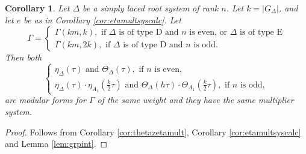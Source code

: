 \documentclass[11pt,a4paper]{amsart}
\newtheorem{corollary}[theorem]{Corollary}
\theoremstyle{definition}
\begin{document}
\begin{corollary} Let $\Delta$ be a simply laced root system of rank $n$. Let $k=|G_{\Delta}|$, and let $e$ be as in Corollary \ref{cor:etamultsyscalc}. 
Let \[\Gamma=\begin{cases}
\Gamma(km,k), \textrm{ if } \Delta \textrm{ is of type D and } n \textrm{ is even, or } \Delta \textrm{ is of type E} \\
\Gamma(km,2k), \textrm{ if } \Delta \textrm{ is of type D and } n \textrm{ is odd}.
\end{cases}\]
Then both
\[
\begin{cases}
\eta_{\Delta}(\tau) \textrm{ and }\Theta_{\Delta}(\tau), \textrm{ if } n \textrm{ is even}, \\
\eta_{\Delta}(\tau) \cdot \eta_{A_1}(\frac{k}{2}\tau) \textrm{ and }\Theta_{\Delta}(h\tau) \cdot \Theta_{A_1}(\frac{k}{2}\tau), \textrm{ if } n \textrm{ is odd},
\end{cases}
\]
are modular forms for $\Gamma$ of the same weight and they have the same multiplier system.
\label{cor:etathetamod}
\end{corollary}
\begin{proof}
Follows from Corollary \ref{cor:thetazetamult}, Corollary \ref{cor:etamultsyscalc} and Lemma \ref{lem:grpint}.
\end{proof}



\end{document}
